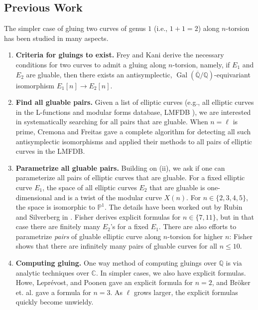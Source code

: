 \documentclass{amsproc}
\numberwithin{equation}{section}
\theoremstyle{definition}
\theoremstyle{remark}
\DeclareMathOperator{\Gal}{Gal}
\newcommand{\QQ}{\mathbb Q}
\newcommand{\CC}{\mathbb C}
\newcommand{\Qbar}{\overline{\QQ}}
\newcommand{\GalQ}{\Gal(\Qbar/\QQ)}
\begin{document}
\subsection{Previous Work}
The simpler case of gluing two curves of genus $1$ (i.e., $1+1=2$) along $n$-torsion has been studied in many aspects.
\begin{enumerate}[label=(\roman*)]
\item \textbf{Criteria for gluings to exist.} Frey and Kani \cite{frey_kani}  derive the necessary conditions for two curves to admit a gluing along $n$-torsion, namely, if $E_1$ and $E_2$ are gluable, then there exists an antisymplectic, $\GalQ$-equivariant isomorphism $E_1[n]\to E_2[n]$.
\item \textbf{Find all gluable pairs.} Given a list of elliptic curves (e.g., all elliptic curves in the L-functions and modular forms database, LMFDB \cite{lmfdb}),
we are interested in systematically searching for all pairs that are gluable.
When $n=\ell$ is prime, Cremona and Freitas \cite{global_symplectic_type} gave a complete algorithm for detecting all such antisymplectic isomorphisms and applied their methods to all pairs of elliptic curves in the LMFDB. 
\item \textbf{Parametrize all gluable pairs.} Building on (ii),
we ask if one can parameterize all pairs of elliptic curves that are gluable. For a fixed elliptic curve $E_1$, the space of all elliptic curves $E_2$ that are gluable is one-dimensional and is a twist of the modular curve $X(n)$. For $n\in\{2,3,4,5\}$, the space is isomorphic to $\mathbb P^1$. The details have been worked out by Rubin and Silverberg in \cite{ec_gluable_family_2, ec_gluable_family_3_5, ec_gluable_family_4}. 
Fisher \cite{ec_gluable_family_7_11} derives explicit formulas for $n\in\{7,11\}$, but in that case there are finitely many $E_2$'s for a fixed $E_1$.
There are also efforts to parametrize \emph{pairs} of gluable elliptic curve along $n$-torsion for higher $n$: Fisher \cite[Cor.~1.3]{ec_gluable_pairs} shows that there are infinitely many pairs of gluable curves for all $n\leq 10$.
\item \textbf{Computing gluing.} One way method of computing gluings over $\QQ$ is via analytic techniques over $\CC$. In simpler cases, we also have explicit formulas. Howe, Lepr\'evost, and Poonen \cite[Prop.~4]{ec_2_torsion_gluing} gave an explicit formula for $n=2$, and Br\"oker et. al. \cite[\S A.1]{ec_3_torsion_gluing} gave a formula for $n=3$. As $\ell$ grows larger, the explicit formulas quickly become unwieldy.
\end{enumerate}
\end{document}

